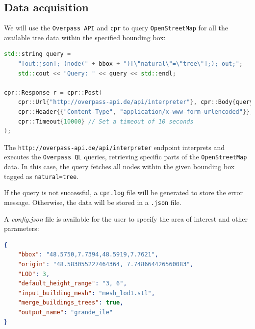 \documentclass[12pt]{article}
\begin{document}
\subsection{Data acquisition}

We will use the \texttt{Overpass API} and \texttt{cpr} to query
\texttt{OpenStreetMap} for all the available tree data within the specified
bounding box:

\begin{lstlisting}[language=C++]
std::string query =
    "[out:json]; (node(" + bbox + ")[\"natural\"=\"tree\"];); out;";
    std::cout << "Query: " << query << std::endl;

cpr::Response r = cpr::Post(
    cpr::Url{"http://overpass-api.de/api/interpreter"}, cpr::Body{query},
    cpr::Header{{"Content-Type", "application/x-www-form-urlencoded"}},
    cpr::Timeout{10000} // Set a timeout of 10 seconds
);
\end{lstlisting}

The \texttt{http://overpass-api.de/api/interpreter} endpoint interprets and
executes the \texttt{Overpass QL}\cite{overpass-ql} queries, retrieving
specific parts of the \texttt{OpenStreetMap} data. In this case, the query
fetches all nodes within the given bounding box tagged as \texttt{natural=tree}.

If the query is not successful, a \texttt{cpr.log} file will be generated to
store the error message. Otherwise, the data will be stored in a \texttt{.json} file.

A \textit{config.json} file is available for the user to specify the area of
interest and other parameters:

\begin{lstlisting}[language=json]
{
    "bbox": "48.5750,7.7394,48.5919,7.7621",
    "origin": "48.583055227464364, 7.748664426560083",
    "LOD": 3,
    "default_height_range": "3, 6",
    "input_building_mesh": "mesh_lod1.stl",
    "merge_buildings_trees": true,
    "output_name": "grande_ile"
}
\end{lstlisting}
\end{document}
